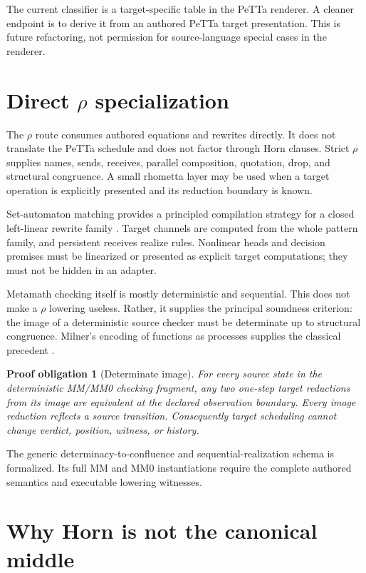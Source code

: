 \documentclass[11pt]{article}
\newtheorem{obligation}{Proof obligation}
\theoremstyle{remark}
\begin{document}
The current classifier is a target-specific table in the PeTTa renderer.  A
cleaner endpoint is to derive it from an authored PeTTa target presentation.
This is future refactoring, not permission for source-language special cases
in the renderer.

\section{Direct \texorpdfstring{$\rho$}{rho} specialization}

The $\rho$ route consumes authored equations and rewrites directly.  It does
not translate the PeTTa schedule and does not factor through Horn clauses.
Strict $\rho$ supplies names, sends, receives, parallel composition,
quotation, drop, and structural congruence.  A small rhometta layer may be used
when a target operation is explicitly presented and its reduction boundary is
known.

Set-automaton matching provides a principled compilation strategy for a
closed left-linear rewrite family \cite{BouwmanErkens2022}.  Target channels
are computed from the whole pattern family, and persistent receives realize
rules.  Nonlinear heads and decision premises must be linearized or presented
as explicit target computations; they must not be hidden in an adapter.

Metamath checking itself is mostly deterministic and sequential.  This does
not make a $\rho$ lowering useless.  Rather, it supplies the principal
soundness criterion: the image of a deterministic source checker must be
determinate up to structural congruence.  Milner's encoding of functions as
processes supplies the classical precedent \cite{Milner1990}.

\begin{obligation}[Determinate image]
For every source state in the deterministic MM/MM0 checking fragment, any two
one-step target reductions from its image are equivalent at the declared
observation boundary.  Every image reduction reflects a source transition.
Consequently target scheduling cannot change verdict, position, witness, or
history.
\end{obligation}

The generic determinacy-to-confluence and sequential-realization schema is
formalized.  Its full MM and MM0 instantiations require the complete authored
semantics and executable lowering witnesses.

\section{Why Horn is not the canonical middle}
\end{document}
